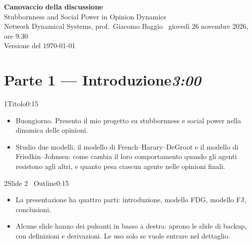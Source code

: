 \newenvironment{discorso}{\begin{itemize}[nosep,leftmargin=1em,label={\color{gray}\textbullet},itemsep=2pt]}{\end{itemize}}
\newcommand{\clic}{{\color{unipd}\scriptsize[passo 2]}\ }
\newcommand{\parte}[2]{\section*{#1\hfill{\normalsize\itshape #2}}}



\begin{center}
  {\LARGE\bfseries Canovaccio della discussione}\\[3pt]
  {\large Stubbornness and Social Power in Opinion Dynamics}\\[2pt]
  Network Dynamical Systems, prof.\ Giacomo Baggio \textperiodcentered\ giovedì 26 novembre 2026, ore 9:30\\[2pt]
  {\small\color{gray} Versione del \today}
\end{center}

\parte{Parte 1 — Introduzione}{3:00}

\begin{slidepag}{1}{Titolo}{0:15}
  \begin{discorso}
    \item Buongiorno. Presento il mio progetto su stubbornness e social power nella dinamica delle opinioni.
    \item Studio due modelli, il modello di French–Harary–DeGroot e il modello di Friedkin–Johnsen: come cambia il loro comportamento quando gli agenti resistono agli altri, e quanto pesa ciascun agente nelle opinioni finali.
  \end{discorso}
\end{slidepag}

\begin{slidepag}{2}{Slide 2 \textperiodcentered\ Outline}{0:15}
  \begin{discorso}
    \item La presentazione ha quattro parti: introduzione, modello FDG, modello FJ, conclusioni.
    \item Alcune slide hanno dei pulsanti in basso a destra: aprono le slide di backup, con definizioni e derivazioni. Le uso solo se vuole entrare nel dettaglio.
  \end{discorso}
\end{slidepag}

